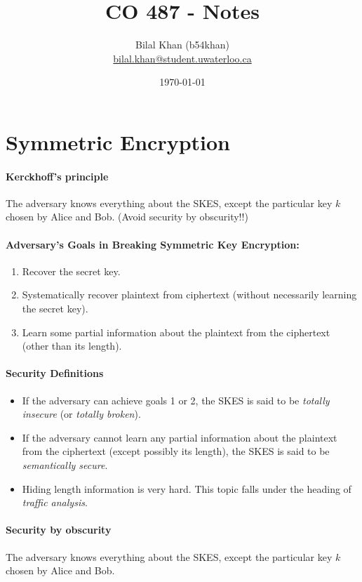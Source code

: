 \documentclass[11pt]{article}
\title{CO 487 - Notes}
\author{Bilal Khan (b54khan)\\
\href{mailto:bilal.khan@student.uwaterloo.ca}{bilal.khan@student.uwaterloo.ca}}
\date{\today}
\begin{document}
\maketitle

\tableofcontents

\section{Symmetric Encryption}

\paragraph{Kerckhoff's principle} The adversary knows everything about the SKES, except the particular key $k$ chosen by Alice and Bob. (Avoid security by obscurity!!)

\paragraph{Adversary's Goals in Breaking Symmetric Key Encryption:}
\begin{enumerate}
    \item Recover the secret key.
    \item Systematically recover plaintext from ciphertext (without necessarily learning the secret key).
    \item Learn some partial information about the plaintext from the ciphertext (other than its length).
\end{enumerate}

\paragraph{Security Definitions}
\begin{itemize}
    \item If the adversary can achieve goals 1 or 2, the SKES is said to be \textit{totally insecure} (or \textit{totally broken}).
    \item If the adversary cannot learn any partial information about the plaintext from the ciphertext (except possibly its length), the SKES is said to be \textit{semantically secure}.
    \item Hiding length information is very hard. This topic falls under the heading of \textit{traffic analysis}.
\end{itemize}

\paragraph{Security by obscurity} The adversary knows everything about the SKES, except the particular key $k$ chosen by Alice and Bob.
\end{document}

